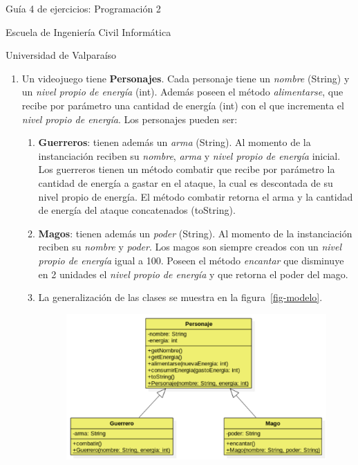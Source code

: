 \documentclass{article}
\begin{document}
	\centerline{\sc \large Gu\'ia 4 de ejercicios: Programaci\'on 2}
	\centerline{\sc \normalsize Escuela de Ingenier\'ia Civil Inform\'atica}
	\centerline{\sc \normalsize  Universidad de Valpara\'iso}

	\vspace{1pc}

	\begin{enumerate}
	    \item Un videojuego tiene \textbf{Personajes}. Cada personaje tiene un \emph{nombre} (String) y un \emph{nivel propio de energ\'ia} (int). Adem\'as poseen el m\'etodo \emph{alimentarse}, que recibe por par\'ametro una cantidad de energ\'ia (int) con el que incrementa el \emph{nivel propio de energ\'ia}. Los personajes pueden ser:
	    \begin{enumerate}
		    \item \textbf{Guerreros}: tienen adem\'as un \emph{arma} (String). Al momento de la instanciaci\'on reciben su \emph{nombre}, \emph{arma} y \emph{nivel propio de energ\'ia} inicial. Los guerreros tienen un m\'etodo combatir que recibe por par\'ametro la cantidad de energ\'ia a gastar en el ataque, la cual es descontada de su nivel propio de energ\'ia. El m\'etodo combatir retorna el arma y la cantidad de energ\'ia del ataque concatenados (toString).
		    \item \textbf{Magos}: tienen adem\'as un \emph{poder} (String). Al momento de la instanciaci\'on reciben su \emph{nombre} y \emph{poder}. Los magos son siempre creados con un \emph{nivel propio de energ\'ia} igual a 100. Poseen el m\'etodo \emph{encantar} que disminuye en 2 unidades el \emph{nivel propio de energ\'ia} y que retorna el poder del mago. 
		\item[] La generalizaci\'on de las clases se muestra en la figura~\ref{fig-modelo}.
		\begin{figure}[htbp!]
			\begin{center}
				\includegraphics[width=10cm]{modelo.pdf}

\end{center}
\end{figure}
\end{enumerate}
\end{enumerate}
\end{document}
